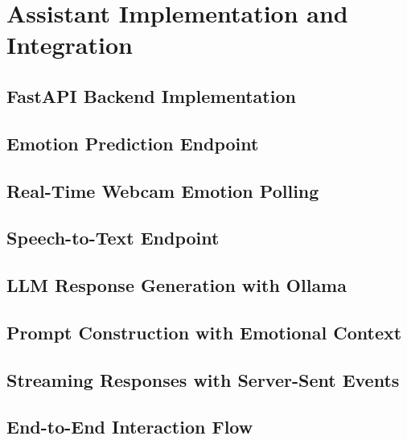 \chapter{Assistant Implementation and Integration}

\section{FastAPI Backend Implementation}

\section{Emotion Prediction Endpoint}

\section{Real-Time Webcam Emotion Polling}

\section{Speech-to-Text Endpoint}

\section{LLM Response Generation with Ollama}

\section{Prompt Construction with Emotional Context}

\section{Streaming Responses with Server-Sent Events}

\section{End-to-End Interaction Flow}
